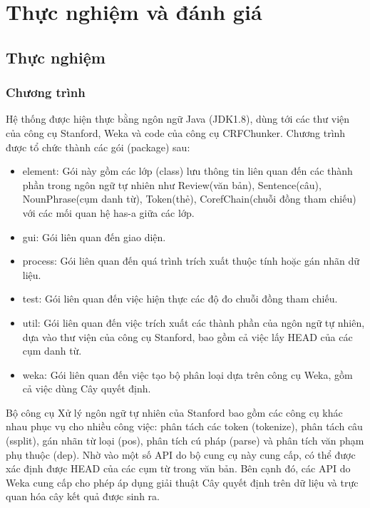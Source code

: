 \documentclass[12pt]{report}
\begin{document}
	\chapter{Thực nghiệm và đánh giá}						
		\section{Thực nghiệm}
			\subsection*{Chương trình}
				\par Hệ thống được hiện thực bằng ngôn ngữ Java (JDK1.8), dùng tới các thư viện của công cụ Stanford, Weka và code của công cụ CRFChunker. Chương trình được tổ chức thành các gói (package) sau:
				\begin{itemize}
					\item{element: Gói này gồm các lớp (class) lưu thông tin liên quan đến các thành phần trong ngôn ngữ tự nhiên như Review(văn bản), Sentence(câu), NounPhrase(cụm danh từ), Token(thẻ), CorefChain(chuỗi đồng tham chiếu) với các mối quan hệ has-a giữa các lớp.}
					\item{gui: Gói liên quan đến giao diện.}
					\item{process: Gói liên quan đến quá trình trích xuất thuộc tính hoặc gán nhãn dữ liệu.}
					\item{test: Gói liên quan đến việc hiện thực các độ đo chuỗi đồng tham chiếu.}
					\item{util: Gói liên quan đến việc trích xuất các thành phần của ngôn ngữ tự nhiên, dựa vào thư viện của công cụ Stanford, bao gồm cả việc lấy HEAD của các cụm danh từ.}
					\item{weka: Gói liên quan đến việc tạo bộ phân loại dựa trên công cụ Weka, gồm cả việc dùng Cây quyết định.}
				\end{itemize}
				\par Bộ công cụ Xử lý ngôn ngữ tự nhiên của Stanford bao gồm các công cụ khác nhau phục vụ cho nhiều công việc: phân tách các token (tokenize), phân tách câu (ssplit), gán nhãn từ loại (pos), phân tích cú pháp (parse) và phân tích văn phạm phụ thuộc (dep). Nhờ vào một số API do bộ cung cụ này cung cấp, có thể được xác định được HEAD của các cụm từ trong văn bản. Bên cạnh đó, các API do Weka cung cấp cho phép áp dụng giải thuật Cây quyết định trên dữ liệu và trực quan hóa cây kết quả được sinh ra. 
\end{document}
